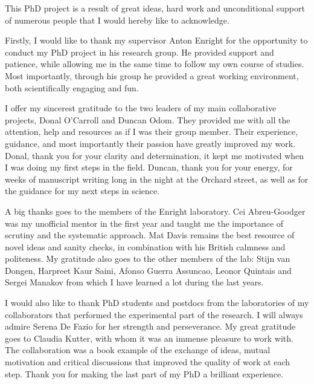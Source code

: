 

\begin{acknowledgementslong} 


This PhD project is a result of great ideas, hard work and unconditional support of numerous people that I would hereby like to acknowledge. 

Firstly, I would like to thank my supervisor Anton Enright for the opportunity to conduct my PhD project in his research group. He provided support and patience, while allowing me in the same time to follow my own course of studies. Most importantly, through his group he provided a great working environment, both scientifically engaging and fun. 

I offer my sincerest gratitude to the two leaders of my main collaborative projects, Donal O'Carroll and Duncan Odom. They provided me with all the attention, help and resources as if I was their group member. Their experience, guidance, and most importantly their passion have greatly improved my work. Donal, thank you for your clarity and determination, it kept me motivated when I was doing my first steps in the field. Duncan, thank you for your energy, for weeks of manuscript writing long in the night at the Orchard street, as well as for the guidance for my next steps in science. 


A big thanks goes to the members of the Enright laboratory. Cei Abreu-Goodger  was my unofficial mentor in the first year and taught me the importance of scrutiny and the systematic approach. Mat Davis remains the best resource of novel ideas and sanity checks, in combination with his British calmness and politeness. My gratitude also goes to the other members of the lab: Stijn van Dongen, Harpreet Kaur Saini, Afonso Guerra Assuncao, Leonor Quintais and Sergei Manakov from which I have learned a lot during the last years.

I would also like to thank PhD students and postdocs from the laboratories of my collaborators that performed the experimental part of the research. I will always admire Serena De Fazio for her strength and perseverance. My great gratitude goes to Claudia Kutter, with whom it was an immense pleasure to work with. The collaboration was a book example of the exchange of ideas, mutual motivation and critical discussions that improved the quality of work at each step. Thank you for making the last part of my PhD a brilliant experience.


\end{acknowledgementslong}
